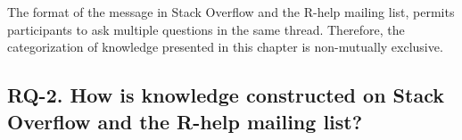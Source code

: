 \documentclass{sig-alternate-05-2015}
\begin{document}



	The format of the message in Stack Overflow and the R-help mailing list, permits participants to ask multiple questions in the same thread.
	Therefore, the categorization of knowledge presented in this chapter is non-mutually exclusive. 

\subsection{RQ-2. How is knowledge constructed on Stack Overflow and the R-help mailing list?}
\label{sec:rq2}
\end{document}
